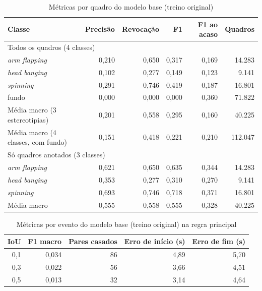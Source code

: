 \begin{table}[htbp]
\centering
\small
\caption{Métricas por quadro do modelo base (treino original)}
\label{tab:quadro-base}
\begin{tabular}{lrrrrr}
\toprule
Classe & Precisão & Revocação & F1 & F1 ao acaso & Quadros \\
\midrule
\multicolumn{6}{l}{Todos os quadros (4 classes)} \\
\textit{arm flapping} & 0,210 & 0,650 & 0,317 & 0,169 & 14.283 \\
\textit{head banging} & 0,102 & 0,277 & 0,149 & 0,123 & 9.141 \\
\textit{spinning} & 0,291 & 0,746 & 0,419 & 0,187 & 16.801 \\
fundo & 0,000 & 0,000 & 0,000 & 0,360 & 71.822 \\
Média macro (3 estereotipias) & 0,201 & 0,558 & 0,295 & 0,160 & 40.225 \\
Média macro (4 classes, com fundo) & 0,151 & 0,418 & 0,221 & 0,210 & 112.047 \\
\midrule
\multicolumn{6}{l}{Só quadros anotados (3 classes)} \\
\textit{arm flapping} & 0,621 & 0,650 & 0,635 & 0,344 & 14.283 \\
\textit{head banging} & 0,353 & 0,277 & 0,310 & 0,270 & 9.141 \\
\textit{spinning} & 0,693 & 0,746 & 0,718 & 0,371 & 16.801 \\
Média macro & 0,555 & 0,558 & 0,555 & 0,328 & 40.225 \\
\bottomrule
\end{tabular}
\end{table}

\begin{table}[htbp]
\centering
\small
\caption{Métricas por evento do modelo base (treino original) na regra principal}
\label{tab:evento-base}
\begin{tabular}{rrrrr}
\toprule
IoU & F1 macro & Pares casados & Erro de início (s) & Erro de fim (s) \\
\midrule
0,1 & 0,034 & 86 & 4,89 & 5,70 \\
0,3 & 0,022 & 56 & 3,66 & 4,51 \\
0,5 & 0,013 & 32 & 3,14 & 4,64 \\
\bottomrule
\end{tabular}
\end{table}

